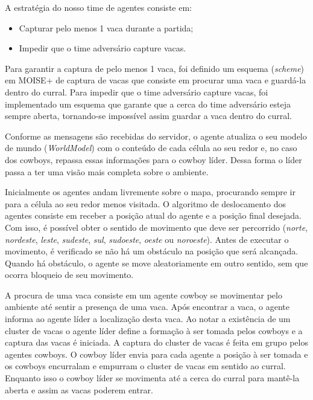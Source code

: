 \documentclass{llncs}
\begin{document}
A estratégia do nosso time de agentes consiste em:

\begin{itemize}
\item Capturar pelo menos 1 vaca durante a partida;
\item Impedir que o time adversário capture vacas.
\end{itemize}

Para garantir a captura de pelo menos 1 vaca, foi definido um esquema (\textit{scheme}) em MOISE+ de captura de vacas que consiste em procurar uma vaca e guardá-la dentro do curral. Para impedir que o time adversário capture vacas, foi implementado um esquema que garante que a cerca do time adversário esteja sempre aberta, tornando-se impossível assim guardar a vaca dentro do curral.

Conforme as mensagens são recebidas do servidor, o agente atualiza o seu modelo de mundo (\textit{WorldModel}) com o conteúdo de cada célula ao seu redor e, no caso dos cowboys, repassa essas informações para o cowboy líder. Dessa forma o líder passa a ter uma visão mais completa sobre o ambiente.

Inicialmente os agentes andam livremente sobre o mapa, procurando sempre ir para a célula ao seu redor menos visitada. O algoritmo de deslocamento dos agentes consiste em receber a posição atual do agente e a posição final desejada. Com isso, é possível obter o sentido de movimento que deve ser percorrido (\textit{norte}, \textit{nordeste}, \textit{leste}, \textit{sudeste}, \textit{sul}, \textit{sudoeste}, \textit{oeste} ou \textit{noroeste}). Antes de executar o movimento, é verificado se não há um obstáculo na posição que será alcançada. Quando há obstáculo, o agente se move aleatoriamente em outro sentido, sem que ocorra bloqueio de seu movimento.

A procura de uma vaca consiste em um agente cowboy se movimentar pelo ambiente até sentir a presença de uma vaca. Após encontrar a vaca, o agente informa ao agente líder a localização desta vaca. Ao notar a existência de um cluster de vacas o agente líder define a formação à ser tomada pelos cowboys e a captura das vacas é iniciada. A captura do cluster de vacas é feita em grupo pelos agentes cowboys. O cowboy líder envia para cada agente a posição à ser tomada e os cowboys encurralam e empurram o cluster de vacas em sentido ao curral. Enquanto isso o cowboy líder se movimenta até a cerca do curral para mantê-la aberta e assim as vacas poderem entrar.
\end{document}

